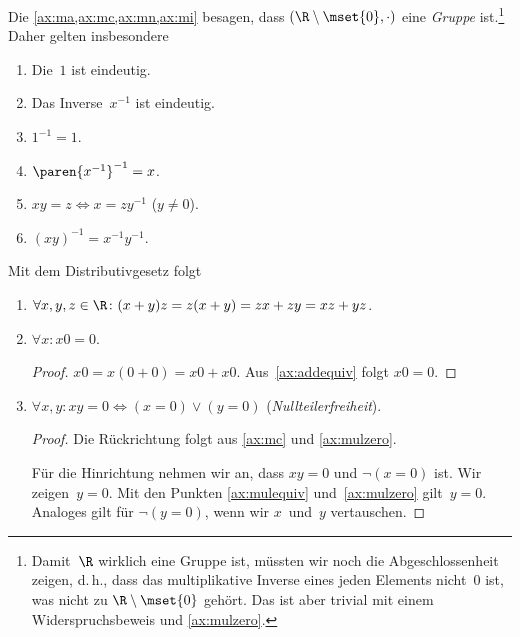 \documentclass[a4paper]{article}
\begin{document}
Die \cref{ax:ma,ax:mc,ax:mn,ax:mi} besagen, dass $(\R \setminus \mset{0}, \cdot)$ eine \emph{Gruppe} ist.\footnote{Damit~$\R$ wirklich eine Gruppe ist, müssten wir noch die Abgeschlossenheit zeigen, d.\,h., dass das multiplikative Inverse eines jeden Elements nicht~$0$ ist, was nicht zu $\R \setminus \mset{0}$ gehört. Das ist aber trivial mit einem Widerspruchsbeweis und \cref{ax:mulzero}.} Daher gelten insbesondere
\begin{enumerate}[(a'), leftmargin=*, widest=(m)]
    \item Die~$1$ ist eindeutig.
    \item Das Inverse~$x^{-1}$ ist eindeutig.
    \item $1^{-1} = 1$.
    \item $\paren{x^{-1}}^{-1} = x$.
    \item $x y = z \iff x = z y^{-1}$ ($y \neq 0$).\label{ax:mulequiv}
    \item $(x y)^{-1} = x^{-1} y^{-1}$.
\end{enumerate}

Mit dem Distributivgesetz folgt
\begin{enumerate}[resume*=conclusions]
    \item $\forall x,y,z \in \R\colon (x+y)z = z(x+y) = zx + zy = xz + yz$.
    \item $\forall x\colon x0 = 0$.
          \begin{proof}
              $x0 = x(0+0) = x0 + x0$. Aus~\cref{ax:addequiv} folgt $x0 = 0$.\label{ax:mulzero}
          \end{proof}
    \item $\forall x,y\colon xy = 0 \iff (x=0) \vee (y=0)$ (\emph{Nullteilerfreiheit}).
          \begin{proof}
              Die Rückrichtung folgt aus \cref{ax:mc} und \cref{ax:mulzero}.

              Für die Hinrichtung nehmen wir an, dass $xy = 0$ und $\neg (x = 0)$ ist. Wir zeigen~$y = 0$. Mit den Punkten \ref{ax:mulequiv} und~\ref{ax:mulzero} gilt~$y = 0$. Analoges gilt für $\neg (y = 0)$, wenn wir $x$~und~$y$ vertauschen.
          \end{proof}
\end{enumerate}
\end{document}
